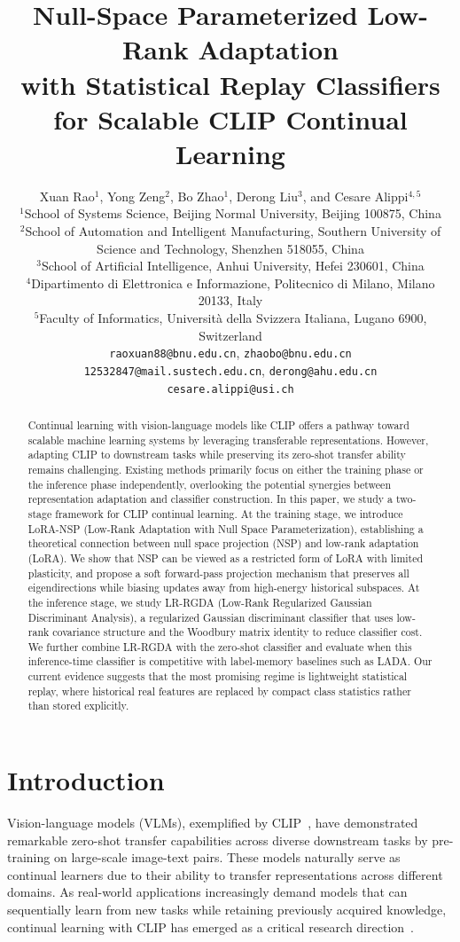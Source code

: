 \documentclass{article}
\title{Null-Space Parameterized Low-Rank Adaptation\\
with Statistical Replay Classifiers\\
for Scalable CLIP Continual Learning}
\author{%
Xuan Rao$^1$, Yong Zeng$^2$, Bo Zhao$^1$, Derong Liu$^3$, and Cesare Alippi$^{4,5}$\\
$^1$School of Systems Science, Beijing Normal University, Beijing 100875, China\\
$^2$School of Automation and Intelligent Manufacturing, Southern University of Science and Technology, Shenzhen 518055, China\\
$^3$School of Artificial Intelligence, Anhui University, Hefei 230601, China\\
$^4$Dipartimento di Elettronica e Informazione, Politecnico di Milano, Milano 20133, Italy\\
$^5$Faculty of Informatics, Universit\`{a} della Svizzera Italiana, Lugano 6900, Switzerland\\
\texttt{raoxuan88@bnu.edu.cn}, \texttt{zhaobo@bnu.edu.cn}\\
\texttt{12532847@mail.sustech.edu.cn}, \texttt{derong@ahu.edu.cn}\\
\texttt{cesare.alippi@usi.ch}
}
\begin{document}
\maketitle

\begin{abstract}
Continual learning with vision-language models like CLIP offers a pathway toward scalable machine learning systems by leveraging transferable representations. However, adapting CLIP to downstream tasks while preserving its zero-shot transfer ability remains challenging. Existing methods primarily focus on either the training phase or the inference phase independently, overlooking the potential synergies between representation adaptation and classifier construction. In this paper, we study a two-stage framework for CLIP continual learning. At the training stage, we introduce LoRA-NSP (Low-Rank Adaptation with Null Space Parameterization), establishing a theoretical connection between null space projection (NSP) and low-rank adaptation (LoRA). We show that NSP can be viewed as a restricted form of LoRA with limited plasticity, and propose a soft forward-pass projection mechanism that preserves all eigendirections while biasing updates away from high-energy historical subspaces. At the inference stage, we study LR-RGDA (Low-Rank Regularized Gaussian Discriminant Analysis), a regularized Gaussian discriminant classifier that uses low-rank covariance structure and the Woodbury matrix identity to reduce classifier cost. We further combine LR-RGDA with the zero-shot classifier and evaluate when this inference-time classifier is competitive with label-memory baselines such as LADA. Our current evidence suggests that the most promising regime is lightweight statistical replay, where historical real features are replaced by compact class statistics rather than stored explicitly.
\end{abstract}

\section{Introduction}
\label{sec:intro}
Vision-language models (VLMs), exemplified by CLIP~\cite{radford2021learning}, have demonstrated remarkable zero-shot transfer capabilities across diverse downstream tasks by pre-training on large-scale image-text pairs. These models naturally serve as continual learners due to their ability to transfer representations across different domains. As real-world applications increasingly demand models that can sequentially learn from new tasks while retaining previously acquired knowledge, continual learning with CLIP has emerged as a critical research direction~\cite{wang2024lora,zheng2023zscl}.
\end{document}
